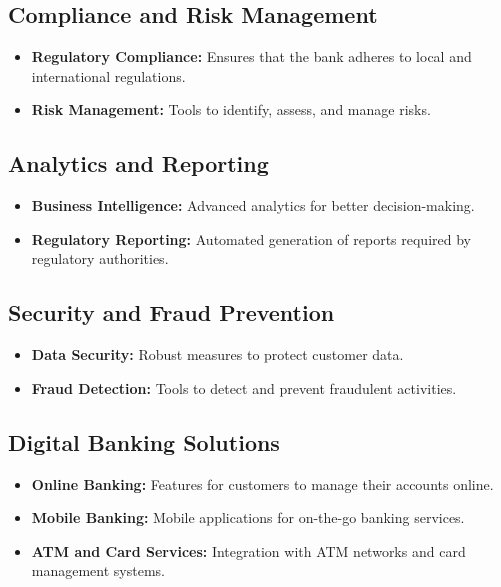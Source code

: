 \documentclass[a4paper,12pt]{report}
\begin{document}
	\subsection{Compliance and Risk Management}
	\begin{itemize}
		\item \textbf{Regulatory Compliance:} Ensures that the bank adheres to local and international regulations.
		\item \textbf{Risk Management:} Tools to identify, assess, and manage risks.
	\end{itemize}
	
	\subsection{Analytics and Reporting}
	\begin{itemize}
		\item \textbf{Business Intelligence:} Advanced analytics for better decision-making.
		\item \textbf{Regulatory Reporting:} Automated generation of reports required by regulatory authorities.
	\end{itemize}
	
	\subsection{Security and Fraud Prevention}
	\begin{itemize}
		\item \textbf{Data Security:} Robust measures to protect customer data.
		\item \textbf{Fraud Detection:} Tools to detect and prevent fraudulent activities.
	\end{itemize}
	
	\subsection{Digital Banking Solutions}
	\begin{itemize}
		\item \textbf{Online Banking:} Features for customers to manage their accounts online.
		\item \textbf{Mobile Banking:} Mobile applications for on-the-go banking services.
		\item \textbf{ATM and Card Services:} Integration with ATM networks and card management systems.
	\end{itemize}
	
\end{document}
